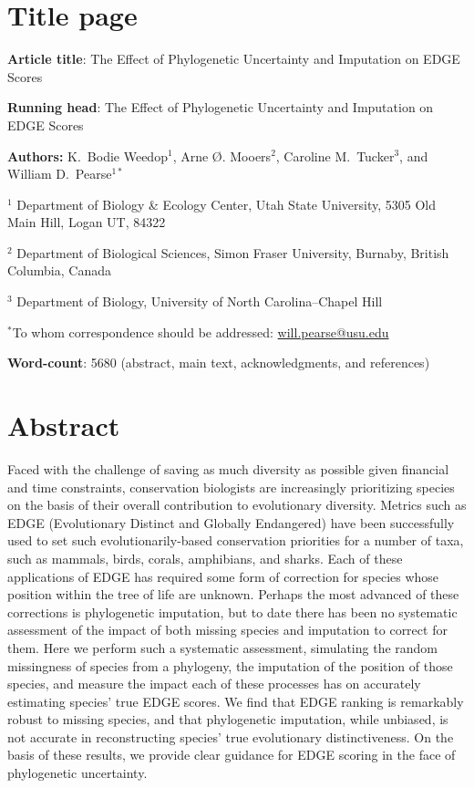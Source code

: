 \documentclass[10pt,english]{article}
\begin{document}
\setlength{\parindent}{0pt}
\section*{Title page}

\textbf{Article title}: The Effect of Phylogenetic Uncertainty and Imputation on EDGE Scores

\textbf{Running head}: The Effect of Phylogenetic Uncertainty and Imputation on EDGE Scores

\textbf{Authors:} K.\ Bodie Weedop$^{1}$, Arne \O. Mooers$^2$, Caroline M.\ Tucker$^3$, and William D.\ Pearse$^{1*}$\

$^1$ Department of Biology \& Ecology Center, Utah State University,
5305 Old Main Hill, Logan UT, 84322

$^2$ Department of Biological Sciences, Simon Fraser University, Burnaby,
British Columbia, Canada

$^3$ Department of Biology, University of North Carolina–Chapel Hill

$^*$To whom correspondence should be addressed:
\url{will.pearse@usu.edu}

\textbf{Word-count}: 5680 (abstract, main text, acknowledgments, and
  references)

\clearpage
\section*{Abstract}

Faced with the challenge of saving as much diversity as possible given financial
and time constraints, conservation biologists are increasingly prioritizing
species on the basis of their overall contribution to evolutionary diversity.
Metrics such as EDGE (Evolutionary Distinct and Globally Endangered) have been
successfully used to set such evolutionarily-based conservation priorities for a
number of taxa, such as mammals, birds, corals, amphibians, and sharks. Each of
these applications of EDGE has required some form of correction for species
whose position within the tree of life are unknown. Perhaps the most advanced of
these corrections is phylogenetic imputation, but to date there has been no
systematic assessment of the impact of both missing species and imputation to
correct for them. Here we perform such a systematic assessment, simulating the
random missingness of species from a phylogeny, the imputation of the position
of those species, and measure the impact each of these processes has on
accurately estimating species' true EDGE scores. We find that EDGE ranking is
remarkably robust to missing species, and that phylogenetic imputation, while
unbiased, is not accurate in reconstructing species' true evolutionary
distinctiveness. On the basis of these results, we provide clear guidance for
EDGE scoring in the face of phylogenetic uncertainty.
\end{document}

